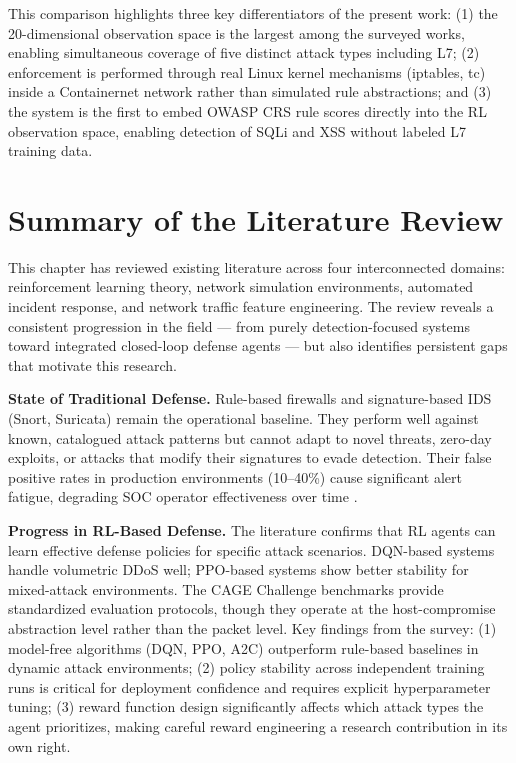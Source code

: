\documentclass[12pt,a4paper]{report}
\begin{document}
This comparison highlights three key differentiators of the present work: (1) the 20-dimensional observation space is the largest among the surveyed works, enabling simultaneous coverage of five distinct attack types including L7; (2) enforcement is performed through real Linux kernel mechanisms (iptables, tc) inside a Containernet network rather than simulated rule abstractions; and (3) the system is the first to embed OWASP CRS rule scores directly into the RL observation space, enabling detection of SQLi and XSS without labeled L7 training data.

\section{Summary of the Literature Review}

This chapter has reviewed existing literature across four interconnected domains: reinforcement learning theory, network simulation environments, automated incident response, and network traffic feature engineering. The review reveals a consistent progression in the field --- from purely detection-focused systems toward integrated closed-loop defense agents --- but also identifies persistent gaps that motivate this research.

\textbf{State of Traditional Defense.} Rule-based firewalls and signature-based IDS (Snort, Suricata) remain the operational baseline. They perform well against known, catalogued attack patterns but cannot adapt to novel threats, zero-day exploits, or attacks that modify their signatures to evade detection. Their false positive rates in production environments (10--40\%) cause significant alert fatigue, degrading SOC operator effectiveness over time \cite{alertFatigue2022}.

\textbf{Progress in RL-Based Defense.} The literature confirms that RL agents can learn effective defense policies for specific attack scenarios. DQN-based systems handle volumetric DDoS well; PPO-based systems show better stability for mixed-attack environments. The CAGE Challenge benchmarks provide standardized evaluation protocols, though they operate at the host-compromise abstraction level rather than the packet level. Key findings from the survey: (1) model-free algorithms (DQN, PPO, A2C) outperform rule-based baselines in dynamic attack environments; (2) policy stability across independent training runs is critical for deployment confidence and requires explicit hyperparameter tuning; (3) reward function design significantly affects which attack types the agent prioritizes, making careful reward engineering a research contribution in its own right.
\end{document}
